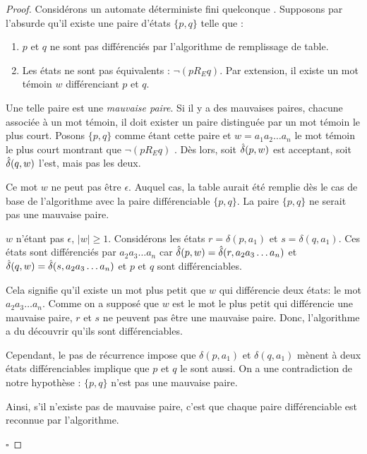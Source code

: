 \begin{proof}

Considérons un automate déterministe fini quelconque \automaton. Supposons par l'absurde qu'il existe une paire d'états $\{p,q\}$ telle que :
\begin{enumerate}
	 \item $p$ et $q$ ne sont pas différenciés par l'algorithme de remplissage de table.
	 \item Les états ne sont pas équivalents : $\neg (pR_E q)$. Par extension, il existe un mot témoin $w$ différenciant $p$ et $q$.
\end{enumerate}

Une telle paire est une \emph{mauvaise paire}. Si il y a des mauvaises paires, chacune associée à un mot témoin, il doit exister un paire distinguée par un mot témoin le plus court. Posons $\{p,q\}$ comme étant cette paire et $w=a_1a_2\dots a_n$ le mot témoin le plus court montrant que $\neg (pR_E q)$ . Dès lors, soit $\hat{\delta}(p,w)$ est acceptant, soit $\hat{\delta}(q,w)$ l'est, mais pas les deux.

Ce mot $w$ ne peut pas être $\epsilon$. Auquel cas, la table aurait été remplie dès le cas de base de l'algorithme avec la paire différenciable $\{p,q\}$. La paire $\{p,q\}$ ne serait pas une mauvaise paire.

$w$ n'étant pas $\epsilon$, $ |w| \ge 1$. Considérons les états $r = \delta(p,a_1)$ et $s=\delta(q,a_1)$. Ces états sont différenciés par $a_2a_3\dots a_n$ car $\hat{\delta}(p,w) = \hat{\delta}(r, a_2a_3\dots a_n)$ et $\hat{\delta}(q,w) = \hat{\delta}(s, a_2a_3\dots a_n)$ et $p$ et $q$ sont différenciables.

Cela signifie qu'il existe un mot plus petit que $w$ qui différencie deux états: le mot $a_2a_3\dots a_n$. Comme on a supposé que $w$ est le mot le plus petit qui différencie une mauvaise paire, $r$ et $s$ ne peuvent pas être une mauvaise paire. Donc, l'algorithme a du découvrir qu'ils sont différenciables.

Cependant, le pas de récurrence impose que $\delta(p, a_1)$ et $\delta(q, a_1)$ mènent à deux états différenciables implique que $p$ et $q$ le sont aussi. On a une contradiction de notre hypothèse : $\{p,q\}$ n'est pas une mauvaise paire.

Ainsi, s'il n'existe pas de mauvaise paire, c'est que chaque paire différenciable est reconnue par l'algorithme.

\hfill$\square$
\end{proof}


